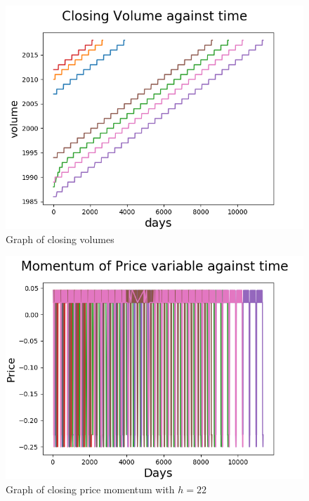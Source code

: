 \documentclass[8pt]{article}
\begin{document}
	\begin{figure}[h]
		\centering
		\includegraphics{all_closing_volume.png}
		\caption{Graph of closing volumes}
		\label{fig:close_volume_graph}
	\end{figure}

	\begin{figure}[h]
		\centering
		\includegraphics{all_momentum_step_22.png}
		\caption{Graph of closing price momentum with $h=22$}
		\label{fig:close_m22_graph}
	\end{figure}
\end{document}
